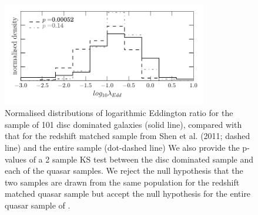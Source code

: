 {\begin{figure}
\centering
\includegraphics[width=0.8\textwidth]{agn/edd_ratio_z_matched_shen_2011_compare.pdf}
\caption[Eddington ratio distribution of the bulgeless AGN sample]{Normalised distributions of logarithmic Eddington ratio for the sample of 101 disc dominated galaxies (solid line), compared with that for the redshift matched sample from Shen et al. (2011; dashed line) and the entire sample (dot-dashed line) We also provide the p-values of a 2 sample KS test between the disc dominated sample and each of the quasar samples. We reject the null hypothesis that the two samples are drawn from the same population for the redshift matched quasar sample but accept the null hypothesis for the entire quasar sample of \citet{shen11}.  
}
\label{fig:eddratioshen}
\end{figure}


}
